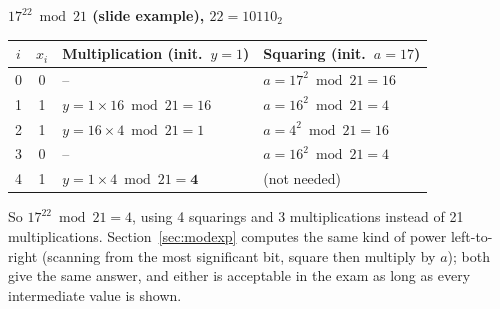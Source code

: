 \begin{center}\small
\textbf{$17^{22} \bmod 21$ (slide example), $22 = 10110_2$}\\[2pt]
\begin{tabular}{@{}ccll@{}}
\toprule
$i$ & $x_i$ & Multiplication (init.\ $y = 1$) & Squaring (init.\ $a = 17$)\\
\midrule
0 & 0 & -- & $a = 17^2 \bmod 21 = 16$\\
1 & 1 & $y = 1 \times 16 \bmod 21 = 16$ & $a = 16^2 \bmod 21 = 4$\\
2 & 1 & $y = 16 \times 4 \bmod 21 = 1$ & $a = 4^2 \bmod 21 = 16$\\
3 & 0 & -- & $a = 16^2 \bmod 21 = 4$\\
4 & 1 & $y = 1 \times 4 \bmod 21 = \mathbf{4}$ & (not needed)\\
\bottomrule
\end{tabular}
\end{center}
So $17^{22} \bmod 21 = 4$, using 4 squarings and 3 multiplications instead of 21 multiplications. Section~\ref{sec:modexp} computes the same kind of power left-to-right (scanning from the most significant bit, square then multiply by $a$); both give the same answer, and either is acceptable in the exam as long as every intermediate value is shown.

